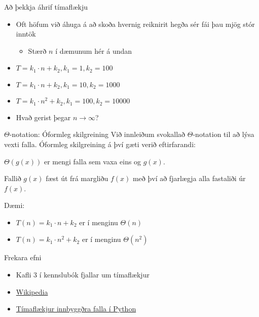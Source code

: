 \documentclass{beamer}
\begin{document}
\begin{frame}{Að þekkja áhrif tímaflækju}
\begin{itemize}
 \item Oft höfum við áhuga á að skoða hvernig reiknirit hegða sér fái þau mjög stór inntök
 \begin{itemize}
  \item Stærð $n$ í dæmunum hér á undan
 \end{itemize}
 \item $T = k_1\cdot n + k_2, k_1 = 1, k_2 = 100$
 \item $T = k_1\cdot n + k_2, k_1 = 10, k_2 = 1000$
 \item $T = k_1\cdot n^2 + k_2, k_1 = 100, k_2 = 10000$
 \item Hvað gerist þegar $n \to \infty$?
\end{itemize}
\end{frame}

\begin{frame}{$\Theta$-notation: Óformleg skilgreining}
Við innleiðum svokallað $\Theta$-notation til að lýsa vexti falla. Óformleg skilgreining á því gæti verið eftirfarandi:

\begin{center}
$\Theta(g(x))$ er mengi falla sem vaxa eins og $g(x)$.
\end{center}

\begin{center}
Fallið $g(x)$ fæst út frá margliðu $f(x)$ með því að fjarlægja alla fastaliði úr $f(x)$.
\end{center}
Dæmi: 
\begin{itemize}
 \item $T(n) = k_1\cdot n + k_2$ er í menginu $\Theta(n)$
 \item $T(n) = k_1\cdot n^2 + k_2$ er í menginu $\Theta(n^2)$
\end{itemize}
\end{frame}

\begin{frame}{Frekara efni}
\begin{itemize}
 \item Kafli 3 í kennslubók fjallar um tímaflækjur
 \item \href{http://en.wikipedia.org/wiki/Time_complexity}{Wikipedia}
 \item \href{https://wiki.python.org/moin/TimeComplexity}{Tímaflækjur innbyggðra falla í Python}
\end{itemize}
\end{frame}
\end{document}
